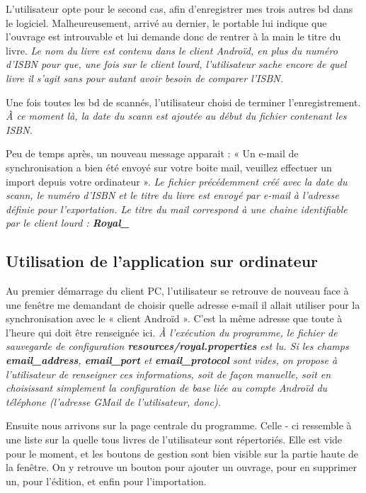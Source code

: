 L'utilisateur opte pour le second cas, afin d'enregistrer mes trois autres bd dans le logiciel. 
Malheureusement, arrivé au dernier, le portable lui indique que l'ouvrage est introuvable et lui demande donc de rentrer à la main le titre du livre. 
\emph{Le nom du livre est contenu dans le client Androïd, en plus du numéro d'ISBN pour que, une fois sur le client lourd,
	l'utilisateur sache encore de quel livre il s'agit sans pour autant avoir besoin de comparer l'ISBN.}

Une fois toutes les bd de scannés, l'utilisateur choisi de terminer l'enregistrement. 
\emph{À ce moment là, la date du scann est ajoutée au début du fichier contenant les ISBN.}

Peu de temps après, un nouveau message apparait : « Un e-mail de synchronisation a bien été envoyé sur votre boite mail, veuillez effectuer un import depuis votre ordinateur ».
\emph{Le fichier précédemment créé avec la date du scann, le numéro d'ISBN et le titre du livre est envoyé par e-mail à l'adresse définie pour l'exportation. 
	Le titre du mail correspond à une chaine identifiable par le client lourd : \textbf{Royal\_}
}

\subsection{Utilisation de l'application sur ordinateur}
Au premier démarrage du client PC, l'utilisateur se retrouve de nouveau face à une fenêtre me demandant de choisir quelle adresse e-mail il allait utiliser pour la synchronisation avec le « client Androïd ». 
C'est la même adresse que toute à l'heure qui doit être renseignée ici.
\emph{À l'exécution du programme, le fichier de sauvegarde de configuration \textbf{resources/royal.properties} est lu. 
	Si les champs \textbf{email\_address}, \textbf{email\_port} et \textbf{email\_protocol} sont vides, 
	on propose à l'utilisateur de renseigner ces informations, soit de façon manuelle, 
	soit en choisissant simplement la configuration de base liée au compte Androïd du téléphone (l'adresse GMail de l'utilisateur, donc).
}

Ensuite nous arrivons sur la page centrale du programme.
Celle - ci ressemble à une liste sur la quelle tous livres de l'utilisateur sont répertoriés.
Elle est vide pour le moment, et les boutons de gestion sont bien visible sur la partie haute de la fenêtre. 
On y retrouve un bouton pour ajouter un ouvrage, pour en supprimer un, pour l'édition, et enfin pour l'importation. 

